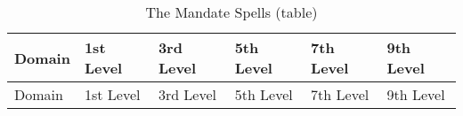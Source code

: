 \begin{longtable}[]{@{}
  >{\raggedright\arraybackslash}p{}
  >{\raggedright\arraybackslash}p{}
  >{\raggedright\arraybackslash}p{}
  >{\raggedright\arraybackslash}p{}
  >{\raggedright\arraybackslash}p{}
  >{\raggedright\arraybackslash}p{}@{}}
\caption{The Mandate Spells
(table)}\label{cleric-subclass-sacred-mandate-spells-table}\tabularnewline
\toprule\noalign{}
\begin{minipage}[b]{\linewidth}\raggedright
Domain
\end{minipage} & \begin{minipage}[b]{\linewidth}\raggedright
1st Level
\end{minipage} & \begin{minipage}[b]{\linewidth}\raggedright
3rd Level
\end{minipage} & \begin{minipage}[b]{\linewidth}\raggedright
5th Level
\end{minipage} & \begin{minipage}[b]{\linewidth}\raggedright
7th Level
\end{minipage} & \begin{minipage}[b]{\linewidth}\raggedright
9th Level
\end{minipage} \\
\midrule\noalign{}
\endfirsthead
\toprule\noalign{}
\begin{minipage}[b]{\linewidth}\raggedright
Domain
\end{minipage} & \begin{minipage}[b]{\linewidth}\raggedright
1st Level
\end{minipage} & \begin{minipage}[b]{\linewidth}\raggedright
3rd Level
\end{minipage} & \begin{minipage}[b]{\linewidth}\raggedright
5th Level
\end{minipage} & \begin{minipage}[b]{\linewidth}\raggedright
7th Level
\end{minipage} & \begin{minipage}[b]{\linewidth}\raggedright
9th Level
\end{minipage} \\

\end{longtable}
